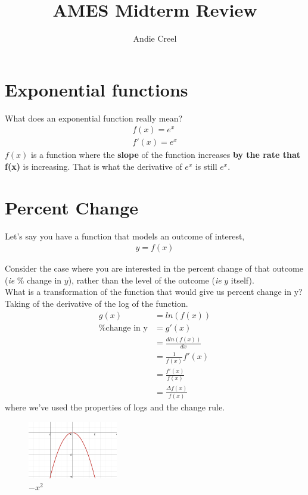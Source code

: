 \documentclass{article}
\title{AMES Midterm Review}
\author{Andie Creel}
\begin{document}
\maketitle

\section{Exponential functions}
What does an exponential function really mean? 
\begin{align}
    f(x) = e^x\\
    f'(x) = e^x
\end{align}
$f(x)$ is a function where the \textbf{slope} of the function increases \textbf{by the rate that f(x)} is increasing. That is what the derivative of $e^x$ is still $e^x$. 

\section{Percent Change}
Let's say you have a function that models an outcome of interest, 
\begin{align}
    y = f(x)
\end{align}

Consider the case where you are interested in the percent change of that outcome (\textit{ie} \% change in $y$), rather than the level of the outcome (\textit{ie} $y$ itself). \\

What is a transformation of the function that would give us percent change in y? Taking of the derivative of the log of the function. 
\begin{align}
    g(x) &= ln(f(x))\\
    \text{\% change in y} &= g'(x)\\
    &= \frac{d ln(f(x))}{dx}\\
    &= \frac{1}{f(x)} f'(x) \\
    & = \frac{f'(x)}{f(x)}\\
    &= \frac{\Delta f(x)}{f(x)}
\end{align}
where we've used the properties of logs and the change rule. 
\begin{figure}[htp]
    \centering
        \includegraphics[width=0.35\textwidth]{Screen Shot 2023-10-23 at 4.53.45 PM.png}
    \caption{$-x^2$}
\end{figure}
\end{document}
